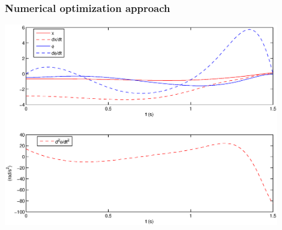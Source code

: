 \documentclass[
compress]
{beamer}
\begin{document}
\begin{frame}
\frametitle{Numerical optimization approach}
\centering
\includegraphics[width=0.9\textwidth]{ballbeammatlab.eps}
\end{frame}
\end{document}
